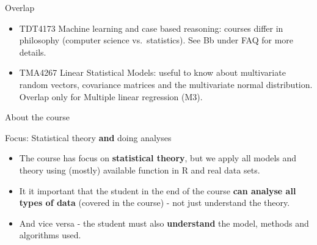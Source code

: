 \documentclass[ignorenonframetext,]{beamer}
\begin{document}
\begin{frame}

\begin{block}{Overlap}

\begin{itemize}
\item
  TDT4173 Machine learning and case based reasoning: courses differ in
  philosophy (computer science vs.~statistics). See Bb under FAQ for
  more details.
\item
  TMA4267 Linear Statistical Models: useful to know about multivariate
  random vectors, covariance matrices and the multivariate normal
  distribution. Overlap only for Multiple linear regression (M3).
\end{itemize}

\end{block}

\end{frame}

\begin{frame}{About the course}

\begin{block}{Focus: Statistical theory \textbf{and} doing analyses}

\begin{itemize}
\item
  The course has focus on \textbf{statistical theory}, but we apply all
  models and theory using (mostly) available function in R and real data
  sets.
\item
  It it important that the student in the end of the course \textbf{can
  analyse all types of data} (covered in the course) - not just
  understand the theory.
\item
  And vice versa - the student must also \textbf{understand} the model,
  methods and algorithms used.
\end{itemize}

\end{block}

\end{frame}
\end{document}
